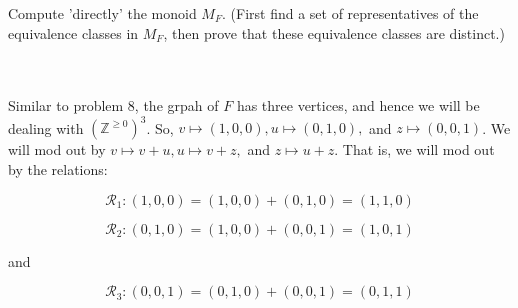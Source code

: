 Compute 'directly' the monoid $M_F$. (First find a set of representatives of the equivalence classes in
$M_F$, then prove that these equivalence classes are distinct.)\\\\

\begin{solution}\renewcommand{\qedsymbol}{}\ \\
    Similar to problem 8, the grpah of $F$ has three vertices, and hence we will be dealing with
    $(\mathbb{Z}^{\geq0})^3$. So, $v\mapsto(1,0,0), u\mapsto(0,1,0),$ and $z\mapsto(0,0,1)$. We will mod
    out by $v\mapsto v+u, u\mapsto v+z,$ and $z\mapsto u+z$. That is, we will mod out by the relations:

    $$\mathcal{R}_1:(1,0,0)=(1,0,0)+(0,1,0)=(1,1,0)$$

    $$\mathcal{R}_2:(0,1,0)=(1,0,0)+(0,0,1)=(1,0,1)$$

    and

    $$\mathcal{R}_3:(0,0,1)=(0,1,0)+(0,0,1)=(0,1,1)$$

\end{solution}